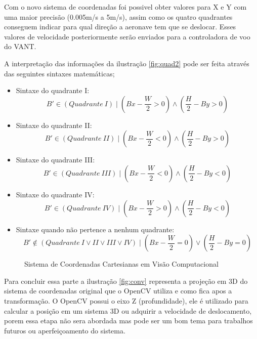 Com o novo sistema de coordenadas foi possivel obter valores para X e Y com uma maior precisão (0.005m/s a 5m/s), assim como os quatro quadrantes conseguem indicar para qual direção a aeronave tem que se deslocar. Esses valores de velocidade posteriormente serão enviados para a controladora de voo do VANT. 

A interpretação das informações da ilustração \ref{fig:quad2} pode ser feita através das seguintes sintaxes matemáticas; 

\begin{itemize}
	\item Sintaxe do quadrante I:\begin{equation}\label{q1} B'\in (Quadrante\ I) \mid \left(Bx - \frac{W}{2} >0\right) \land \left(\frac{H}{2} - By >0\right)\end{equation} 
	\item Sintaxe do quadrante II:\begin{equation}\label{q2} B'\in (Quadrante\ II) \mid \left(Bx - \frac{W}{2} <0\right) \land \left(\frac{H}{2} - By >0\right)\end{equation} 
	\item Sintaxe do quadrante III:\begin{equation}\label{q3} B'\in (Quadrante\ III) \mid \left(Bx - \frac{W}{2} <0\right) \land \left(\frac{H}{2} - By <0\right)\end{equation} 
	\item Sintaxe do quadrante IV:\begin{equation}\label{q4} B'\in (Quadrante\ IV) \mid \left(Bx - \frac{W}{2} >0\right) \land \left(\frac{H}{2} - By <0\right)\end{equation} 
	\item Sintaxe quando não pertence a nenhum quadrante:\begin{equation}\label{nq} B'\notin ( Quadrante\ I\lor II\lor III\lor IV) \mid \left(Bx - \frac{W}{2}=0\right) \lor \left(\frac{H}{2} - By =0\right)\end{equation}
\end{itemize} 

\begin{figure}[H]
	\centering
	\caption{Sistema de Coordenadas Cartesianas em Visão Computacional}
	
	\label{fig:teste}
\end{figure}

Para concluir essa parte a ilustração \ref{fig:conv} representa a projeção em 3D do sistema de coordenadas original que o OpenCV utiliza e como fica apos a transformação. O OpenCV possui o eixo Z (profundidade), ele é utilizado para calcular a posição em um sistema 3D ou adquirir a velocidade de deslocamento, porem essa etapa não sera abordada mas pode ser um bom tema para trabalhos futuros ou aperfeiçoamento do sistema.

